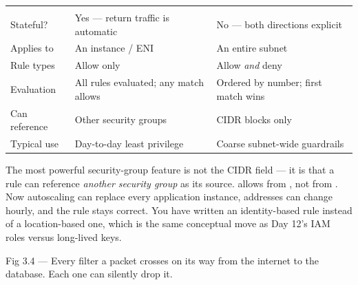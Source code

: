 \begin{center}\small
\wbrowcolors
\begin{tabularx}{\linewidth}{@{}L{30mm} X X@{}}
 &  & \\
Stateful? & Yes --- return traffic is automatic & No --- both directions explicit\\
Applies to & An instance / ENI & An entire subnet\\
Rule types & Allow only & Allow \emph{and} deny\\
Evaluation & All rules evaluated; any match allows & Ordered by number; first match wins\\
Can reference & Other security groups & CIDR blocks only\\
Typical use & Day-to-day least privilege & Coarse subnet-wide guardrails\\
\end{tabularx}
\end{center}

\begin{seniornote}
The most powerful security-group feature is not the CIDR field --- it is that a rule can reference \emph{another security group} as its source.  allows  from , not from . Now autoscaling can replace every application instance, addresses can change hourly, and the rule stays correct. You have written an identity-based rule instead of a location-based one, which is the same conceptual move as Day 12's IAM roles versus long-lived keys.
\end{seniornote}

\begin{wbfigure}{Fig 3.4 — Every filter a packet crosses on its way from the internet to the database. Each one can silently drop it.}
\end{wbfigure}


